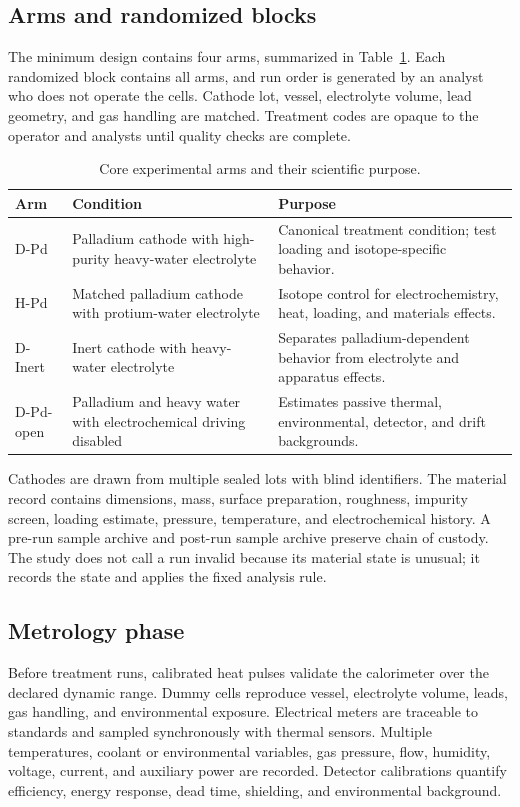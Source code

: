 \documentclass[conference]{IEEEtran}
\begin{document}
\subsection{Arms and randomized blocks}
The minimum design contains four arms, summarized in Table~\ref{tab:arms}. Each randomized block contains all arms, and run order is generated by an analyst who does not operate the cells. Cathode lot, vessel, electrolyte volume, lead geometry, and gas handling are matched. Treatment codes are opaque to the operator and analysts until quality checks are complete.

\begin{table}[t]
\centering
\caption{Core experimental arms and their scientific purpose.}
\label{tab:arms}
\setlength{\tabcolsep}{5pt}
\begin{tabular}{>{\raggedright\arraybackslash}p{}>{\raggedright\arraybackslash}p{}>{\raggedright\arraybackslash}p{}}
\toprule
Arm & Condition & Purpose \\
\midrule
D-Pd & Palladium cathode with high-purity heavy-water electrolyte & Canonical treatment condition; test loading and isotope-specific behavior. \\
H-Pd & Matched palladium cathode with protium-water electrolyte & Isotope control for electrochemistry, heat, loading, and materials effects. \\
D-Inert & Inert cathode with heavy-water electrolyte & Separates palladium-dependent behavior from electrolyte and apparatus effects. \\
D-Pd-open & Palladium and heavy water with electrochemical driving disabled & Estimates passive thermal, environmental, detector, and drift backgrounds. \\
\bottomrule
\end{tabular}
\end{table}

Cathodes are drawn from multiple sealed lots with blind identifiers. The material record contains dimensions, mass, surface preparation, roughness, impurity screen, loading estimate, pressure, temperature, and electrochemical history. A pre-run sample archive and post-run sample archive preserve chain of custody. The study does not call a run invalid because its material state is unusual; it records the state and applies the fixed analysis rule.

\subsection{Metrology phase}
Before treatment runs, calibrated heat pulses validate the calorimeter over the declared dynamic range. Dummy cells reproduce vessel, electrolyte volume, leads, gas handling, and environmental exposure. Electrical meters are traceable to standards and sampled synchronously with thermal sensors. Multiple temperatures, coolant or environmental variables, gas pressure, flow, humidity, voltage, current, and auxiliary power are recorded. Detector calibrations quantify efficiency, energy response, dead time, shielding, and environmental background.
\end{document}
